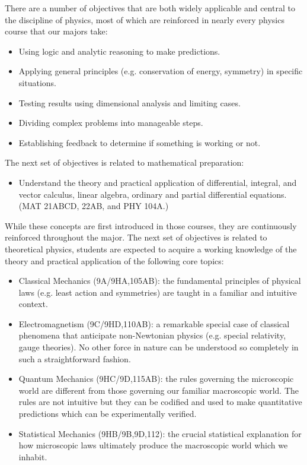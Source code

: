 \documentclass[12pt]{article}
\begin{document}
There are a number of objectives that are both widely applicable and
central to the discipline of physics, most of which are reinforced in
nearly every physics course that our majors take:
\begin{itemize}
 \item Using logic and analytic reasoning to make predictions.  
 \item Applying general principles (e.g. conservation of energy,
   symmetry) in specific situations.
 \item Testing results using dimensional analysis and limiting cases. 
 \item Dividing complex problems into manageable steps.
 \item Establishing feedback to determine if something is working or not.
\end{itemize}  
The next set of objectives is related to mathematical preparation:
\begin{itemize}
\item Understand the theory and practical application of differential,
  integral, and vector calculus, linear algebra, ordinary and partial
  differential equations.  (MAT 21ABCD, 22AB, and PHY 104A.)
\end{itemize}
While these concepts are first introduced in those courses, they are
continuously reinforced throughout the major.  The next set of
objectives is related to theoretical physics, students are expected
to acquire a working knowledge of the theory and practical application
of the following core topics:
\begin{itemize}
 \item Classical Mechanics (9A/9HA,105AB): the fundamental principles
   of physical laws (e.g. least action and symmetries) are taught in a
   familiar and intuitive context.
 \item Electromagnetism (9C/9HD,110AB): a remarkable special case of
   classical phenomena that anticipate non-Newtonian physics
   (e.g. special relativity, gauge theories).  No other force in
   nature can be understood so completely in such a straightforward
   fashion.  
 \item Quantum Mechanics (9HC/9D,115AB): the rules governing the
   microscopic world are different from those governing our familiar
   macroscopic world.  The rules are not intuitive but they can be
   codified and used to make quantitative predictions which can be
   experimentally verified.
 \item Statistical Mechanics (9HB/9B,9D,112): the crucial statistical
   explanation for how microscopic laws ultimately produce the
   macroscopic world which we inhabit.
\end{itemize}
\end{document}
